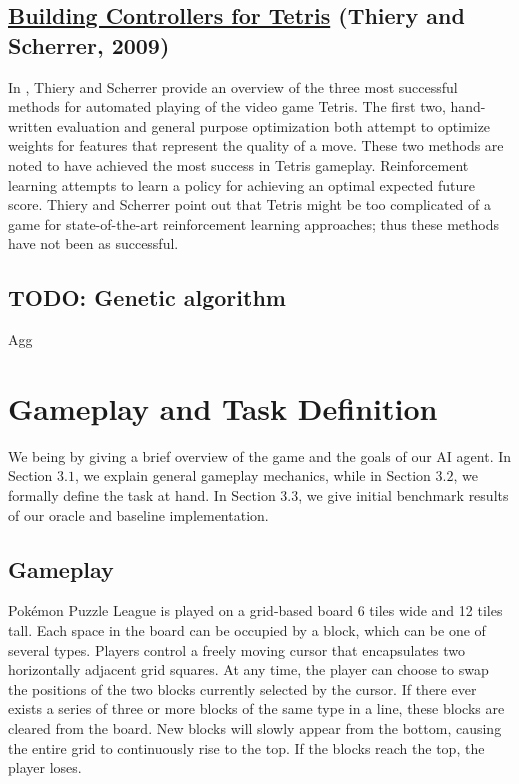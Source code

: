 \documentclass[12pt]{IEEEtran}
\begin{document}
\subsection{\href{https://hal.inria.fr/inria-00418954/document}{Building Controllers for Tetris} (Thiery and Scherrer, 2009)}
In \cite{2}, Thiery and Scherrer provide an overview of the three most successful methods for automated playing of the video game Tetris. The first two, hand-written evaluation and general purpose optimization both attempt to optimize weights for features that represent the quality of a move. These two methods are noted to have achieved the most success in Tetris gameplay. Reinforcement learning attempts to learn a policy for achieving an optimal expected future score. Thiery and Scherrer point out that Tetris might be too complicated of a game for state-of-the-art reinforcement learning approaches; thus these methods have not been as successful.

\subsection{TODO: Genetic algorithm}

Agg

\section{Gameplay and Task Definition}

We being by giving a brief overview of the game and the goals of our AI agent. In Section $3.1$, we explain general gameplay mechanics, while in Section $3.2$, we formally define the task at hand. In Section $3.3$, we give initial benchmark results of our oracle and baseline implementation.

\subsection{Gameplay}
Pok\'{e}mon Puzzle League is played on a grid-based board 6 tiles wide and 12 tiles tall. Each space in the board can be occupied by a block, which can be one of several types. Players control a freely moving cursor that encapsulates two horizontally adjacent grid squares. At any time, the player can choose to swap the positions of the two blocks currently selected by the cursor. If there ever exists a series of three or more blocks of the same type in a line, these blocks are cleared from the board. New blocks will slowly appear from the bottom, causing the entire grid to continuously rise to the top. If the blocks reach the top, the player loses.
\end{document}
